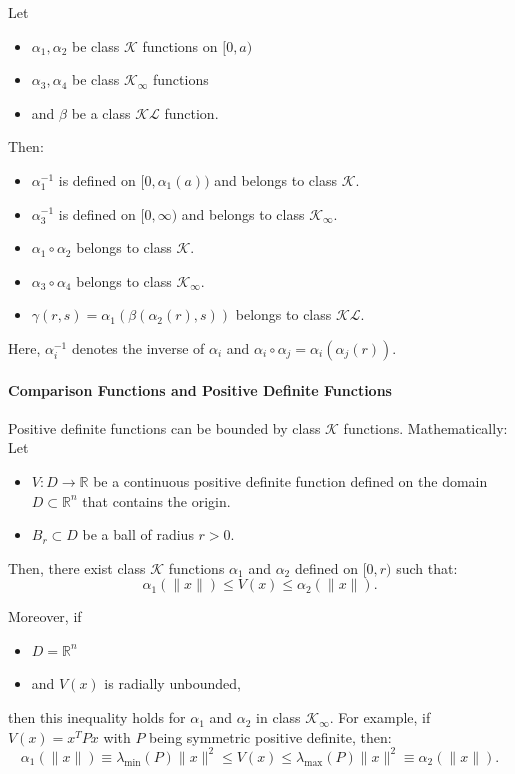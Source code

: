 Let
\begin{itemize}
    \item $\alpha_1, \alpha_2$ be class $\mathcal{K}$ functions on $[0, a)$  %
    \item $\alpha_3, \alpha_4$ be class $\mathcal{K}_\infty$ functions
    \item and $\beta$ be a class $\mathcal{K}\mathcal{L}$ function.
\end{itemize}

Then:
\begin{itemize}
    \item $\alpha_1^{-1}$ is defined on $[0, \alpha_1(a))$ and belongs to class $\mathcal{K}$.  %
    \item $\alpha_3^{-1}$ is defined on $[0, \infty)$ and belongs to class $\mathcal{K}_\infty$.  %
    \item $\alpha_1 \circ \alpha_2$ belongs to class $\mathcal{K}$.
    \item $\alpha_3 \circ \alpha_4$ belongs to class $\mathcal{K}_\infty$.
    \item $\gamma(r, s) = \alpha_1(\beta(\alpha_2(r), s))$ belongs to class $\mathcal{K}\mathcal{L}$.
\end{itemize}
Here, $\alpha_i^{-1}$ denotes the inverse of $\alpha_i$ and $\alpha_i \circ \alpha_j = \alpha_i(\alpha_j(r))$.

\paragraph{Comparison Functions and Positive Definite Functions}
Positive definite functions can be bounded by class $\mathcal{K}$ functions. Mathematically: Let
\begin{itemize}
    \item $V : D \to \mathbb{R}$ be a continuous positive definite function defined on the domain $D \subset \mathbb{R}^n$ that contains the origin.
    \item $B_r \subset D$ be a ball of radius $r > 0$.
\end{itemize}
Then, there exist class $\mathcal{K}$ functions $\alpha_1$ and $\alpha_2$ defined on $[0, r)$ such that:  %
\noindent\begin{equation*}
    \alpha_1(\|x\|) \leq V(x) \leq \alpha_2(\|x\|).
\end{equation*}
\newpar{}

Moreover, if
\begin{itemize}
    \item $D = \mathbb{R}^n$
    \item and $V(x)$ is radially unbounded,
\end{itemize}
then this inequality holds for $\alpha_1$ and $\alpha_2$ in class $\mathcal{K}_\infty$.
\newpar{}
For example, if $V(x) = x^T P x$ with $P$ being symmetric positive definite, then:
\noindent\begin{equation*}
    \alpha_1(\|x\|) \equiv \lambda_{\min}(P) \|x\|^2 \leq V(x) \leq \lambda_{\max}(P) \|x\|^2 \equiv \alpha_2(\|x\|).
\end{equation*}

